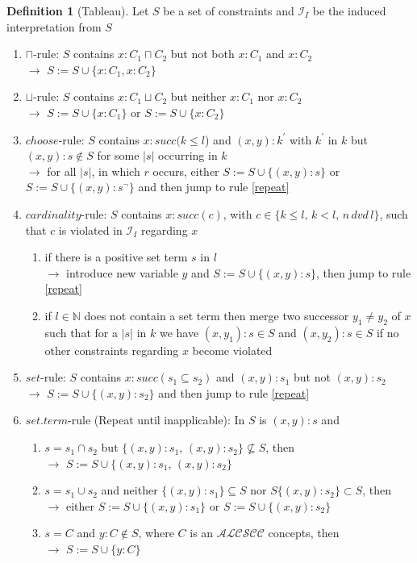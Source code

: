 \documentclass[a4paper,11pt]{scrartcl}
\theoremstyle{break}
\theoremstyle{definition}
\newtheorem{mydef}{Definition}
\begin{document}
\begin{mydef}[Tableau]
Let $S$ be a set of constraints and $\mathcal{I}_I$ be the induced interpretation from $S$
\begin{enumerate}
\item\label{cap} $\sqcap$-rule: $S$ contains $x:C_1\sqcap C_2$ but not both $x:C_1$ and $x:C_2$\\
$\rightarrow$ $S:=S\cup\{x:C_1, x:C_2\}$
\item\label{cup} $\sqcup$-rule: $S$ contains $x:C_1\sqcup C_2$ but neither $x:C_1$ nor $x:C_2$\\
$\rightarrow$ $S:=S\cup\{x:C_1\}$ or $S:=S\cup\{x:C_2\}$
\item\label{choose}$choose$-rule: $S$ contains
$x:succ(k\leq l$) and $(x,y):k^\prime$ with $k^\prime$ in $k$ but $(x,y):s\not\in S$ for some $|s|$ occurring in $k$\\
$\rightarrow$ for all $|s|$, in which $r$ occurs, either $S:=S\cup\{(x,y):s\}$ or $S:=S\cup\{(x,y):s^\neg\}$ and then jump to rule \ref{repeat}
\item\label{c}$cardinality$-rule: $S$ contains $x:succ(c)$, with $c\in\{k\leq l,\,k<l,\, n\, dvd\,l\}$, such that $c$ is violated in $\mathcal{I}_I$ regarding $x$
\begin{enumerate}
\item \label{setterm} if there is a positive set term $s$ in $l$\\
$\rightarrow$ introduce new variable $y$ and $S:=S\cup\{(x,y):s\}$, then jump to rule \ref{repeat}
\item \label{exceeded} if $l\in \mathbb{N}$ does not contain a set term then merge two successor $y_1\neq y_2$ of $x$ such that for a $|s|$ in $k$ we have $(x,y_1):s\in S$ and $(x,y_2):s\in S$ if no other constraints regarding $x$ become violated
\end{enumerate}
\item\label{s}$set$-rule: $S$ contains $x:succ(s_1\subseteq s_2)$ and $(x,y):s_1$ but not $(x,y):s_2$\\
$\rightarrow$ $S:=S\cup\{(x,y):s_2\}$ and then jump to rule \ref{repeat}
\item\label{repeat} $set.term$-rule (Repeat until inapplicable): In $S$ is $(x,y):s$ and
\begin{enumerate}
\item\label{setterm1} $s=s_1\cap s_2$ but $\{(x,y):s_1,\,(x,y):s_2\}\not\subseteq S$, then\\
$\rightarrow$ $S:=S\cup \{(x,y):s_1,\,(x,y):s_2\}$ 
\item\label{setterm2} $s=s_1\cup s_2$ and neither $\{(x,y):s_1\}\subseteq S$ nor $S\{(x,y):s_2\}\subset S$, then\\
$\rightarrow$ either $S:=S\cup \{(x,y):s_1\}$ or $S:=S\cup \{(x,y):s_2\}$ 
\item\label{setterm3} $s=C$ and $y:C\notin S$, where $C$ is an $\mathcal{ALCSCC}$ concepts, then \\
$\rightarrow$ $S:=S\cup\{y:C\}$
\end{enumerate}
\end{enumerate}
\end{mydef}
\end{document}
